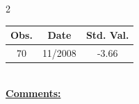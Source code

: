 
\bigskip 
\begin{multicols}{2}{ 
\begin{tabular}{ccc}
\hline  Obs.  &  Date &  Std. Val. \\ 
\hline 
                       70 &       11/2008 &         -3.66 \vspace{-.12in} \\  
 \end{tabular} 
\\ 
 \columnbreak 
 \singlespacing 
 \underline{\textbf{Comments:}} \\ 
 \bigskip       

 } 
\end{multicols} 
